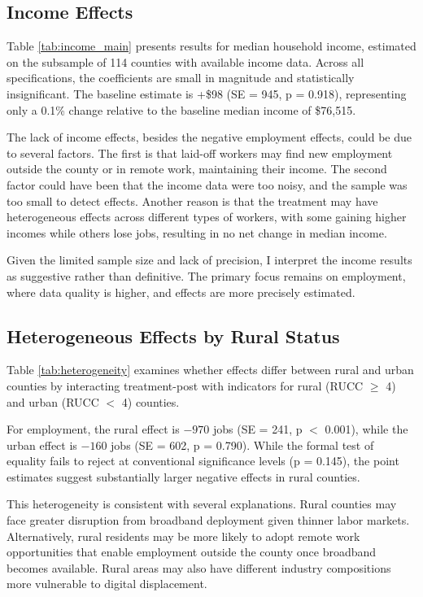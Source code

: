 \documentclass[12pt]{article}
\begin{document}
\subsection{Income Effects}

Table \ref{tab:income_main} presents results for median household income, estimated on the subsample of 114 counties with available income data. Across all specifications, the coefficients are small in magnitude and statistically insignificant. The baseline estimate is +\$98 (SE = 945, p = 0.918), representing only a 0.1\% change relative to the baseline median income of \$76,515.

The lack of income effects, besides the negative employment effects, could be due to several factors. The first is that laid-off workers may find new employment outside the county or in remote work, maintaining their income. The second factor could have been that the income data were too noisy, and the sample was too small to detect effects. Another reason is that the treatment may have heterogeneous effects across different types of workers, with some gaining higher incomes while others lose jobs, resulting in no net change in median income.

Given the limited sample size and lack of precision, I interpret the income results as suggestive rather than definitive. The primary focus remains on employment, where data quality is higher, and effects are more precisely estimated.

\subsection{Heterogeneous Effects by Rural Status}

Table \ref{tab:heterogeneity} examines whether effects differ between rural and urban counties by interacting treatment-post with indicators for rural (RUCC $\geq$ 4) and urban (RUCC $<$ 4) counties.

For employment, the rural effect is $-970$ jobs (SE = 241, p $<$ 0.001), while the urban effect is $-160$ jobs (SE = 602, p = 0.790). While the formal test of equality fails to reject at conventional significance levels (p = 0.145), the point estimates suggest substantially larger negative effects in rural counties.

This heterogeneity is consistent with several explanations. Rural counties may face greater disruption from broadband deployment given thinner labor markets. Alternatively, rural residents may be more likely to adopt remote work opportunities that enable employment outside the county once broadband becomes available. Rural areas may also have different industry compositions more vulnerable to digital displacement.
\end{document}
